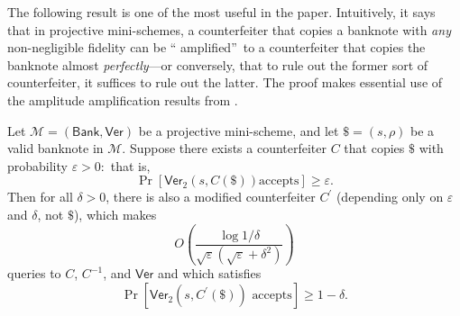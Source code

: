 The following result is one of the most useful in the paper. Intuitively, it
says that in projective mini-schemes, a counterfeiter that copies a banknote
with \emph{any} non-negligible fidelity can be \textquotedblleft
amplified\textquotedblright\ to a counterfeiter that copies the banknote
almost \emph{perfectly}---or conversely, that to rule out the former sort of
counterfeiter, it suffices to rule out the latter. The proof makes essential
use of the amplitude amplification results from .

\begin{theorem}
\label{miniamp}Let $\mathcal{M}=\left(
\mathsf{Bank},\mathsf{Ver}\right)  $ be a projective mini-scheme, and let
$\$=\left(  s,\rho\right)  $ be a valid banknote in $\mathcal{M}$. Suppose
there exists a counterfeiter $C$ that copies $\$$ with probability
$\varepsilon>0$:\ that is,%
\[
\Pr\left[  \mathsf{Ver}_{2}\left(  s,C\left(  \$\right)  \right)  \text{
accepts}\right]  \geq\varepsilon.
\]
Then for all $\delta>0$, there is also a modified counterfeiter $C^{\prime}$
(depending only on $\varepsilon$ and $\delta$, not $\$$), which makes%
\[
O\left(  \frac{\log1/\delta}{\sqrt{\varepsilon}\left(  \sqrt{\varepsilon
}+\delta^{2}\right)  }\right)
\]
queries to $C$, $C^{-1}$, and $\mathsf{Ver}$ and which satisfies%
\[
\Pr\left[  \mathsf{Ver}_{2}\left(  s,C^{\prime}\left(  \$\right)  \right)
\text{ accepts}\right]  \geq1-\delta.
\]

\end{theorem}

